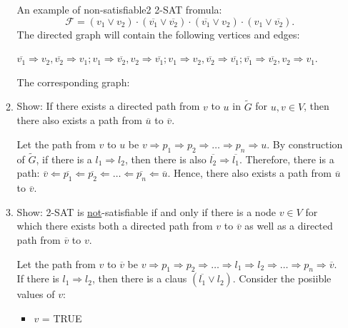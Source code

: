 \documentclass{homework}
\begin{document}
\begin{enumerate}[label=(\alph*)]
\begin{enumerate}[label=(\roman*)]
		An example of non-satisfiable2 2-SAT fromula: \[\mathcal{F}=(v_1\lor v_2)\cdot(\overline{v_1}\lor \overline{v_2})\cdot(\overline{v_1}\lor v_2)\cdot(v_1\lor \overline{v_2}).\] The directed graph will contain the following vertices and edges:

$\overline{v_1}\Rightarrow v_2, \overline{v_2}\Rightarrow v_1; v_1\Rightarrow \overline{v_2}, v_2\Rightarrow \overline{v_1}; v_1\Rightarrow v_2, \overline{v_2}\Rightarrow \overline{v_1}; \overline{v_1}\Rightarrow \overline{v_2}, v_2\Rightarrow v_1$. 

The corresponding graph:

\begin{center}
\end{center}
\item Show: If there exists a directed path from $v$ to $u$ in  $\widetilde{G}$ for $u,v\in V$, then there also exists a path from $\overline{u}$ to $\overline{v}$.
	
	Let the path from $v$ to $u$ be $v\Rightarrow p_1 \Rightarrow p_2 \Rightarrow \dots \Rightarrow p_n \Rightarrow u$. By construction of  $\widetilde{G}$, if there is a $l_1\Rightarrow l_2$, then there is also $\overline{l_2}\Rightarrow \overline{l_1}$. Therefore, there is a path: $\overline{v}\Leftarrow \overline{p_1} \Leftarrow \overline{p_2} \Leftarrow \dots \Leftarrow \overline{p_n} \Leftarrow \overline{u}$. Hence, there also exists a path from $\overline{u}$ to $\overline{v}$.
\item Show: 2-SAT is \underline{not}-satisfiable if and only if there is a node $v\in V$ for which there exists both a directed path from $v$ to $\overline{v}$ as well as a directed path from $\overline{v}$ to $v$.

	Let the path from $v$ to  $\overline{v}$ be $v\Rightarrow p_1 \Rightarrow p_2 \Rightarrow \dots \Rightarrow l_1 \Rightarrow l_2 \Rightarrow \dots \Rightarrow p_n \Rightarrow \overline{v}$. If there is $l_1 \Rightarrow l_2$, then there is a claus $(\overline{l_1} \lor l_2)$. Consider the posiible values of $v$:
	\begin{itemize}
		\item $v$ = TRUE


\end{itemize}
\end{enumerate}
\end{enumerate}
\end{document}
